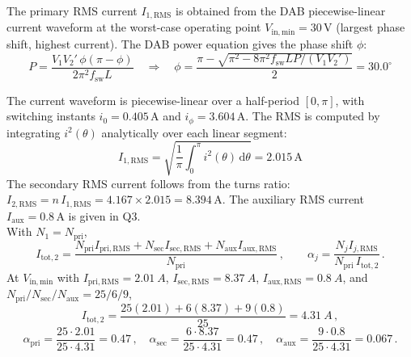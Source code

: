\documentclass{PELsmallreport}
\begin{document}
\begin{framed}
	\vspace{2em}

    The primary RMS current $I_{1,\mathrm{RMS}}$ is obtained from the DAB piecewise-linear current waveform at the worst-case operating point $V_\mathrm{in,min}=30\,\mathrm{V}$ (largest phase shift, highest current). The DAB power equation gives the phase shift $\phi$:
\begin{equation}
    P = \frac{V_1 V_2' \,\phi(\pi-\phi)}{2\pi^2 f_\mathrm{sw} L} \quad\Rightarrow\quad \phi = \frac{\pi - \sqrt{\pi^2 - 8\pi^2 f_\mathrm{sw} L P / (V_1 V_2')}}{2} = 30.0^\circ
\end{equation}

The current waveform is piecewise-linear over a half-period $[0,\pi]$, with switching instants $i_0 = 0.405\,\mathrm{A}$ and $i_\phi = 3.604\,\mathrm{A}$. The RMS is computed by integrating $i^2(\theta)$ analytically over each linear segment:
\begin{equation}
    I_{1,\mathrm{RMS}} = \sqrt{\frac{1}{\pi}\int_0^{\pi} i^2(\theta)\,\mathrm{d}\theta} = 2.015\,\mathrm{A}
\end{equation}
The secondary RMS current follows from the turns ratio: $I_{2,\mathrm{RMS}} = n\,I_{1,\mathrm{RMS}} = 4.167\times2.015 = 8.394\,\mathrm{A}$. The auxiliary RMS current $I_\mathrm{aux}=0.8\,\mathrm{A}$ is given in Q3.
\\
	 With $N_1=N_{\mathrm{pri}}$,
\begin{equation}
  I_{\mathrm{tot,2}}=\frac{N_{\mathrm{pri}}I_{\mathrm{pri,RMS}}+N_{\mathrm{sec}}I_{\mathrm{sec,RMS}}+N_{\mathrm{aux}}I_{\mathrm{aux,RMS}}}{N_{\mathrm{pri}}}\,,\qquad
  \alpha_j=\frac{N_j I_{j,\mathrm{RMS}}}{N_{\mathrm{pri}}\,I_{\mathrm{tot,2}}}\,.
\end{equation}
At $V_{\mathrm{in,min}}$ with $I_{\mathrm{pri,RMS}}=\SI{2.01}{A}$, $I_{\mathrm{sec,RMS}}=\SI{8.37}{A}$, $I_{\mathrm{aux,RMS}}=\SI{0.8}{A}$, and $N_{\mathrm{pri}}/N_{\mathrm{sec}}/N_{\mathrm{aux}}=25/6/9$,
\begin{equation}
  I_{\mathrm{tot,2}}=\frac{25(\num{2.01})+6(\num{8.37})+9(\num{0.8})}{25}=\SI{4.31}{A}\,,
\end{equation}
\begin{equation}
  \alpha_{\mathrm{pri}}=\frac{25\cdot\num{2.01}}{25\cdot\num{4.31}}=\num{0.47}\,,\quad
  \alpha_{\mathrm{sec}}=\frac{6\cdot\num{8.37}}{25\cdot\num{4.31}}=\num{0.47}\,,\quad
  \alpha_{\mathrm{aux}}=\frac{9\cdot\num{0.8}}{25\cdot\num{4.31}}=\num{0.067}\,.
\end{equation}
	\vspace{2em}
\end{framed}
\end{document}
